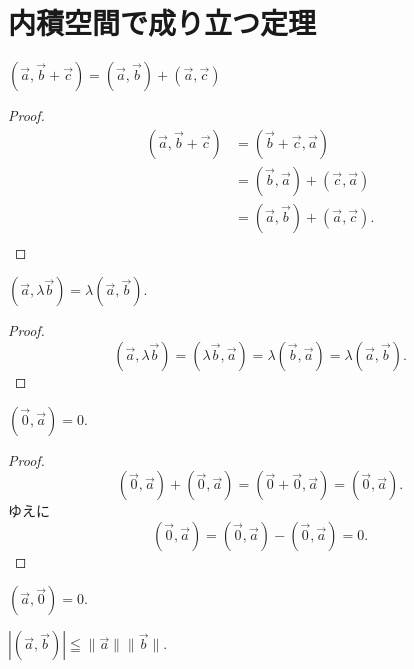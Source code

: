 \chapter{内積空間で成り立つ定理}

\begin{thm}
  \((\vec{a},\vec{b}+\vec{c})=(\vec{a},\vec{b})+(\vec{a},\vec{c})\)
\end{thm}

\begin{proof}
  \begin{align*}
    (\vec{a},\vec{b}+\vec{c}) &= (\vec{b}+\vec{c},\vec{a}) \\
                              &= (\vec{b},\vec{a})+(\vec{c},\vec{a}) \\
                              &= (\vec{a},\vec{b})+(\vec{a},\vec{c}). \\
  \end{align*}
\end{proof}

\begin{thm}
  \((\vec{a},\lambda\vec{b})=\lambda(\vec{a},\vec{b}).\)
\end{thm}

\begin{proof}
  \[(\vec{a},\lambda\vec{b})=(\lambda\vec{b},\vec{a})=\lambda(\vec{b},\vec{a})=\lambda(\vec{a},\vec{b}).\]
\end{proof}

\begin{thm}\label{251101135001}
  \((\vec{0},\vec{a})=0.\)
\end{thm}

\begin{proof}
  \[(\vec{0},\vec{a})+(\vec{0},\vec{a})=(\vec{0}+\vec{0},\vec{a})=(\vec{0},\vec{a}).\]
  ゆえに
  \[(\vec{0},\vec{a})=(\vec{0},\vec{a})-(\vec{0},\vec{a})=0.\]
\end{proof}

\begin{col*}
  \((\vec{a},\vec{0})=0.\)
\end{col*}

\begin{thm}\label{251101135202}
  \(|(\vec{a},\vec{b})|\leqq\|\vec{a}\|\|\vec{b}\|.\)
\end{thm}

